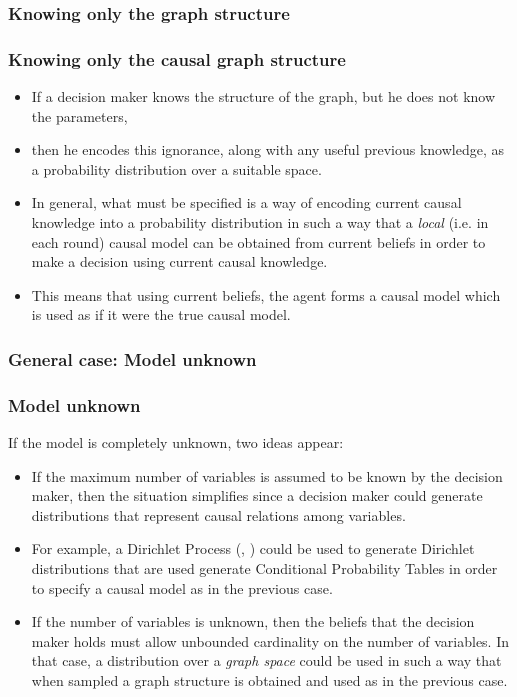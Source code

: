 \documentclass{beamer}
\theoremstyle{plain}
\begin{document}
\subsubsection{Knowing only the graph structure}
\begin{frame}
\frametitle{Knowing only the causal graph structure}
\begin{itemize}
\item If a decision maker knows the structure of the graph, but he does not know the parameters,
\item then he encodes this ignorance, along with any useful previous knowledge, as a probability distribution over a suitable space.
\item In general, what must be specified is a way of encoding current causal knowledge into a probability distribution in such a way that a \textit{local} (i.e. in each round) causal model can be obtained from current beliefs in order to make a decision using current causal knowledge.
\item This means that using current beliefs, the agent forms a causal model which is used as if it were the true causal model.
\end{itemize}
\end{frame}
\subsubsection{General case: Model unknown}
\begin{frame}
\frametitle{Model unknown}
If the model is completely unknown, two ideas appear:
\begin{itemize}
\item If the maximum number of variables is assumed to be known by the decision maker, then the situation simplifies since a decision maker could generate distributions that represent causal relations among variables.
\item For example, a Dirichlet Process (\cite{ferguson1973bayesian}, \cite{ghosal2017fundamentals}) could be used to generate Dirichlet distributions that are used generate Conditional Probability Tables in order to specify a causal model as in the previous case.
\item If the number of variables is unknown, then the beliefs that the decision maker holds must allow unbounded cardinality on the number of variables. In that case, a distribution over a \textit{graph space} could be used in such a way that when sampled a graph structure is obtained and used as in the previous case.  
\end{itemize}
\end{frame}
\end{document}
